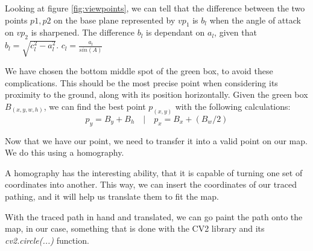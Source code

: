Looking at figure \ref{fig:viewpoints}, we can tell that the difference between the two points \(p1,p2\) on the base plane represented by \(vp_1\) is \(b_l\) when the angle of attack on \(vp_2\) is sharpened. The difference \(b_l\) is dependant on \(a_l\), given that \(b_l = \sqrt{c_l^2-a_l^2}\). \(c_l = \frac{a_l}{sin(A)}\)\newline

We have chosen the bottom middle spot of the green box, to avoid these complications. This should be the most precise point when considering its proximity to the ground, along with its position horizontally. Given the green box \(B_(x,y,w,h)\), we can find the best point \(p_(x,y)\) with the following calculations:
\[p_y = B_y+B_h \quad | \quad p_x = B_x + (B_w / 2)\]

Now that we have our point, we need to transfer it into a valid point on our map. We do this using a homography.

A homography has the interesting ability, that it is capable of turning one set of coordinates into another. This way, we can insert the coordinates of our traced pathing, and it will help us translate them to fit the map.

With the traced path in hand and translated, we can go paint the path onto the map, in our case, something that is done with the CV2 library and its \textsl{cv2.circle(...)} function.